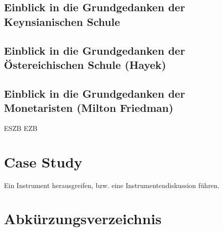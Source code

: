 \documentclass[
onecolumn,
a4paper,
abstracton,
parskip=half
,final
]{scrartcl}
\begin{document}
\subsection{Einblick in die Grundgedanken der Keynsianischen Schule}

\subsection{Einblick in die Grundgedanken der {\"O}stereichischen Schule (Hayek)}

\subsection{Einblick in die Grundgedanken der Monetaristen (Milton Friedman)}


\clearpage
\ac{ESZB}
\ac{EZB}



\section{Case Study}
\label{sec1:caseStudy}
Ein Instrument herausgreifen, bzw. eine Instrumentendiskussion f{\"u}hren.

\subsection{}
\subsection{}
\subsection{}



\clearpage

\section{Abk{\"u}rzungsverzeichnis}


\begin{acronym}[ESZB]
  	
 	 
  


\end{acronym}


\vspace{10pt}
	\newpage
\singlespacing



\newpage





%
\end{document}
